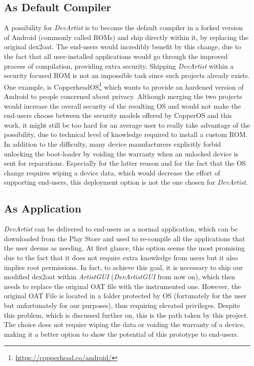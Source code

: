\subsection{As Default Compiler}
\label{sc:deploy}
A possibility for \emph{DevArtist} is to become the default compiler in a forked version of Android (commonly called ROMs) and ship directly within it, by replacing the original dex2oat. The end-users would incredibly benefit by this change, due to the fact that all user-installed applications would go through the improved process of compilation, providing extra security. Shipping \emph{DevArtist} within a security focused ROM is not an impossible task since such projects already exists. One example, is CopperheadOS\footnote{\url{https://copperhead.co/android/}} which wants to provide an hardened version of Android to people concerned about privacy. Although merging the two projects would increase the overall security of the resulting OS and would not make the end-users choose between the security models offered by CopperOS and this work, it might still be too hard for an average user to really take advantage of the possibility, due to technical level of knowledge required to install a custom ROM. In addition to the difficulty, many device manufacturers explicitly forbid unlocking the boot-loader by voiding the warranty when an unlocked device is sent for reparations. Especially for the latter reason and for the fact that the OS change requires wiping a device data, which would decrease the effort of supporting end-users, this deployment option is not the one chosen for \emph{DevArtist}.

\subsection{As Application}
\emph{DevArtist} can be delivered to end-users as a normal application, which can be downloaded from the Play Store and used to re-compile all the applications that the user deems as needing. At first glance, this option seems the most promising due to the fact that it does not require extra knowledge from users but it also implies root permissions. In fact, to achieve this goal, it is necessary to ship our modified dex2oat within \emph{ArtistGUI} (\emph{DevArtistGUI} from now on), which then needs to replace the original OAT file with the instrumented one. However, the original OAT File is located in a folder protected by OS (fortunately for the user but unfortunately for our purposes), thus requiring elevated privileges. Despite this problem, which is discussed further on, this is the path taken by this project. The choice does not require wiping the data or voiding the warranty of a device, making it a better option to show the potential of this prototype to end-users.

